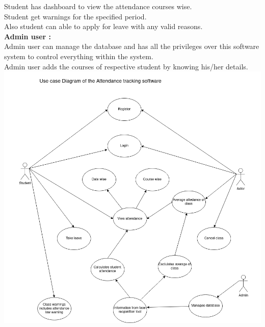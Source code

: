 \documentclass[conference]{IEEEtran}
\begin{document}
Student has dashboard to view the attendance courses wise.\\[1mm]
Student  get warnings  for  the  specified period.\\[1mm]
Also student can able to apply for leave with any valid reasons.\\[2mm]
\textbf{Admin user :}\\[2mm]
Admin user can manage the database and  has  all  the privileges  over  this software system  to  control  everything  within the system.\\[1mm]
Admin user adds the courses of respective student by knowing his/her details.\\[2mm]
\includegraphics[width=\linewidth]{use case.png}\\
\end{document}
